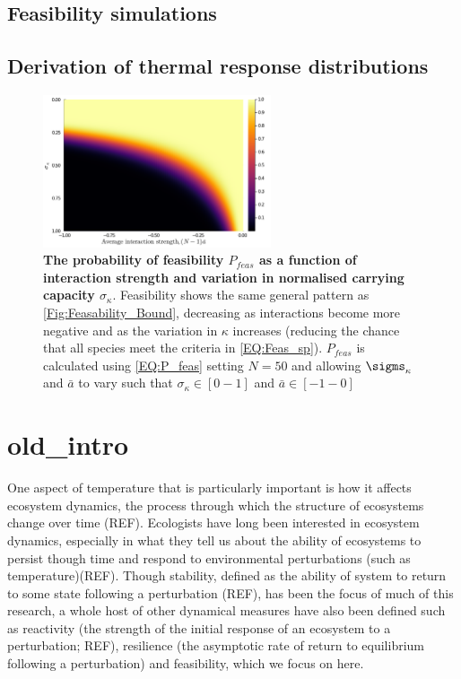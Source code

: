\documentclass{article}
\begin{document}
\subsection{Feasibility simulations} \label{SI_Sec:Feas_sims}

\subsection{Derivation of thermal response distributions} \label{SI_Sec:TPC_dist}

\begin{figure}
    \centering
    \includegraphics[width = 0.6\textwidth]{docs/Figures/Fig_2.pdf}
    \caption{\textbf{The probability of feasibility $P_{feas}$ as a function of interaction strength and variation in normalised carrying capacity $\sigma_{\kappa}$}. Feasibility shows the same general pattern as \cref{Fig:Feasability_Bound}, decreasing as interactions become more negative and as the variation in $\kappa$ increases (reducing the chance that all species meet the criteria in \cref{EQ:Feas_sp}). $P_{feas}$ is calculated using \cref{EQ:P_feas} setting $N=50$ and allowing $\sigms_{\kappa}$ and $\bar{a}$ to vary such that $\sigma_{\kappa} \in [0 - 1]$ and $\bar{a} \in [-1 - 0]$}
    \label{Fig:P_feas}
\end{figure}

\section{old_intro}
One aspect of temperature that is particularly important is how it affects ecosystem dynamics, the process through which the structure of ecosystems change over time (REF). Ecologists have long been interested in ecosystem dynamics, especially in what they tell us about the ability of ecosystems to persist though time and respond to environmental perturbations (such as temperature)(REF). Though stability, defined as the ability of system to return to some state following a perturbation (REF), has been the focus of much of this research, a whole host of other dynamical measures have also been defined such as reactivity (the strength of the initial response of an ecosystem to a perturbation; REF), resilience (the asymptotic rate of return to equilibrium following a perturbation) and feasibility, which we focus on here. 
\end{document}
